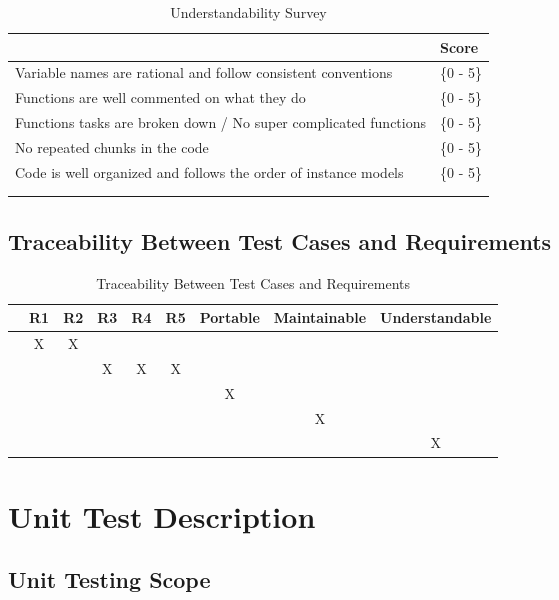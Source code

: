 \documentclass[12pt, titlepage]{article}
\begin{document}
\begin{longtable}[h]{l l}
\label{ut}
	\begin{tabular}{l l} 
	\toprule		
	\textbf{Item} & \textbf{Score}\\
	\midrule 
	Variable names are rational and follow consistent conventions & \{0 - 5\}\\
	Functions are well commented on what they do & \{0 - 5\} \\
	Functions tasks are broken down / No super complicated functions & \{0 - 5\} \\
	No repeated chunks in the code & \{0 - 5\} \\
	Code is well organized and follows the order of instance models & \{0 - 5\} \\
	\bottomrule
	\caption{Understandability Survey} \label{Undgradesheet} \\
\end{tabular}\\
\end{longtable}

\subsection{Traceability Between Test Cases and Requirements}

\begin{table}[h!]
	\centering
	\begin{tabular}{|c|c|c|c|c|c|c|c|c|}
		\hline
		& R1 & R2 & R3 & R4 & R5 & Portable & Maintainable & Understandable\\
		\hline
		\nameref{Ainput}    &X&X& & & & & & \\ \hline
		\nameref{Aoutput}   & & &X&X&X& & & \\ \hline
		\nameref{Aport}     & & & & & &X& & \\ \hline
		\nameref{Amaintain} & & & & & & &X& \\ \hline
		\nameref{Audst}     & & & & & & & &X\\ \hline
	\end{tabular}
	\caption{Traceability Between Test Cases and Requirements}
	\label{Table:A_trace}
\end{table}

\section{Unit Test Description}
\label{unittest}

\subsection{Unit Testing Scope}
\end{document}
